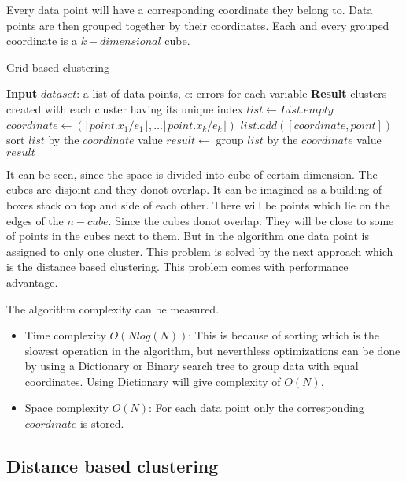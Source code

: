 Every data point will have a corresponding coordinate they belong to. Data points are then grouped together by their coordinates. Each and every grouped coordinate is a \(k-dimensional\) cube. 

\begin{algorithm}
	\caption{Grid based clustering}\label{alg:gridExistence}
	\begin{algorithmic}[1]
		\State \textbf{Input} $dataset$: a list of data points, $e$: errors for each variable
		\State \textbf{Result} clusters created with each cluster having its unique index
		\State $list \gets List.empty$
		 
		\State $coordinate \gets (\lfloor point.x_{1}/e_1 \rfloor, \ldots \lfloor point.x_{k}/e_k \rfloor)$
		\State $list.add([coordinate, point])$
		\EndFor
		\State sort $list$ by the  $coordinate$ value 
		\State $result \gets$ group $list$ by the  $coordinate$ value 
        \State\Return $result$
		\EndProcedure
	\end{algorithmic}
\end{algorithm}

It can be seen, since the space is divided into cube of certain dimension. The cubes are disjoint and they donot overlap. It can be imagined as a building of boxes stack on top and side of each other. There will be points which lie on the edges of the \(n-cube\). Since the cubes donot overlap. They will be close to some of points in the cubes next to them. But in the algorithm one data point is assigned to only one cluster. This problem is solved by the next approach which is the distance based clustering. This problem comes with performance advantage. 

The algorithm complexity can be measured. 
\begin{itemize}
	\item Time complexity \(O(N log(N))\): This is because of sorting which is the slowest operation in the algorithm, but neverthless optimizations can be done by using a Dictionary or Binary search tree to group data with equal coordinates. Using Dictionary will give complexity of \(O(N)\).
	\item Space complexity \(O(N)\): For each data point only the corresponding \(coordinate\) is stored.
\end{itemize}

\subsection{Distance based clustering}

